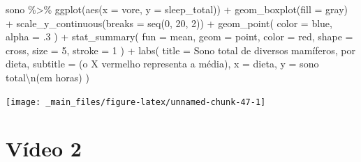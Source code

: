 \documentclass[
  11pt]{report}
\newenvironment{Shaded}{\begin{snugshade}}{\end{snugshade}}
\newcommand{\AttributeTok}[1]{\textcolor[rgb]{0.77,0.63,0.00}{#1}}
\newcommand{\DecValTok}[1]{\textcolor[rgb]{0.00,0.00,0.81}{#1}}
\newcommand{\FunctionTok}[1]{\textcolor[rgb]{0.00,0.00,0.00}{#1}}
\newcommand{\NormalTok}[1]{#1}
\newcommand{\SpecialCharTok}[1]{\textcolor[rgb]{0.00,0.00,0.00}{#1}}
\newcommand{\StringTok}[1]{\textcolor[rgb]{0.31,0.60,0.02}{#1}}
\renewenvironment{Shaded}{
  \begin{mdframed}[%
    roundcorner=2pt,%
    innerleftmargin=5pt,%
    innerrightmargin=5pt,%
    topline=true,%
    leftline=true,%
    rightline=true,%
    bottomline=true,%
    linewidth=0.5pt,%
    linecolor=black!20,%
    backgroundcolor=black!2,%
    skipabove=2ex,%
    skipbelow=2.5ex%
  ]%
}
{
  \end{mdframed}
}
\begin{document}
\begin{Shaded}
\begin{Highlighting}[]
\NormalTok{sono }\SpecialCharTok{\%\textgreater{}\%} 
  \FunctionTok{ggplot}\NormalTok{(}\FunctionTok{aes}\NormalTok{(}\AttributeTok{x =}\NormalTok{ vore, }\AttributeTok{y =}\NormalTok{ sleep\_total)) }\SpecialCharTok{+}
    \FunctionTok{geom\_boxplot}\NormalTok{(}\AttributeTok{fill =} \StringTok{\textquotesingle{}gray\textquotesingle{}}\NormalTok{) }\SpecialCharTok{+}
    \FunctionTok{scale\_y\_continuous}\NormalTok{(}\AttributeTok{breaks =} \FunctionTok{seq}\NormalTok{(}\DecValTok{0}\NormalTok{, }\DecValTok{20}\NormalTok{, }\DecValTok{2}\NormalTok{)) }\SpecialCharTok{+}
    \FunctionTok{geom\_point}\NormalTok{(}
      \AttributeTok{color =} \StringTok{\textquotesingle{}blue\textquotesingle{}}\NormalTok{, }
      \AttributeTok{alpha =}\NormalTok{ .}\DecValTok{3}
\NormalTok{    ) }\SpecialCharTok{+}
    \FunctionTok{stat\_summary}\NormalTok{(}
      \AttributeTok{fun =}\NormalTok{ mean, }
      \AttributeTok{geom =} \StringTok{\textquotesingle{}point\textquotesingle{}}\NormalTok{, }
      \AttributeTok{color =} \StringTok{\textquotesingle{}red\textquotesingle{}}\NormalTok{, }
      \AttributeTok{shape =} \StringTok{\textquotesingle{}cross\textquotesingle{}}\NormalTok{, }
      \AttributeTok{size =} \DecValTok{5}\NormalTok{,}
      \AttributeTok{stroke =} \DecValTok{1}
\NormalTok{    ) }\SpecialCharTok{+}
    \FunctionTok{labs}\NormalTok{(}
      \AttributeTok{title =} \StringTok{\textquotesingle{}Sono total de diversos mamíferos, por dieta\textquotesingle{}}\NormalTok{,}
      \AttributeTok{subtitle =} \StringTok{\textquotesingle{}(o X vermelho representa a média)\textquotesingle{}}\NormalTok{,}
      \AttributeTok{x =} \StringTok{\textquotesingle{}dieta\textquotesingle{}}\NormalTok{,}
      \AttributeTok{y =} \StringTok{\textquotesingle{}sono total}\SpecialCharTok{\textbackslash{}n}\StringTok{(em horas)\textquotesingle{}}
\NormalTok{    )}
\end{Highlighting}
\end{Shaded}

\begin{center}\texttt{[image: \_main\_files/figure-latex/unnamed-chunk-47-1]} \end{center}

\hypertarget{vuxeddeo-2-3}{%
\section{Vídeo 2}\label{vuxeddeo-2-3}}
\end{document}
